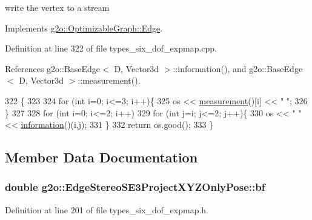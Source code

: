 write the vertex to a stream 



Implements \hyperlink{classg2o_1_1OptimizableGraph_1_1Edge_a804b9a2178249b9297c55b8fbbeda56e}{g2o\+::\+Optimizable\+Graph\+::\+Edge}.



Definition at line 322 of file types\+\_\+six\+\_\+dof\+\_\+expmap.\+cpp.



References g2o\+::\+Base\+Edge$<$ D, Vector3d $>$\+::information(), and g2o\+::\+Base\+Edge$<$ D, Vector3d $>$\+::measurement().


\begin{DoxyCode}
322                                                                 \{
323 
324   \textcolor{keywordflow}{for} (\textcolor{keywordtype}{int} i=0; i<=3; i++)\{
325     os << \hyperlink{classg2o_1_1BaseEdge_a8c20e7ffa66bb7a4a02c8cee82e89c8b}{measurement}()[i] << \textcolor{stringliteral}{" "};
326   \}
327 
328   \textcolor{keywordflow}{for} (\textcolor{keywordtype}{int} i=0; i<=2; i++)
329     \textcolor{keywordflow}{for} (\textcolor{keywordtype}{int} j=i; j<=2; j++)\{
330       os << \textcolor{stringliteral}{" "} <<  \hyperlink{classg2o_1_1BaseEdge_ab682086df7223ce2b039d652416ddc23}{information}()(i,j);
331     \}
332   \textcolor{keywordflow}{return} os.good();
333 \}
\end{DoxyCode}


\subsection{Member Data Documentation}
\subsubsection[{\texorpdfstring{bf}{bf}}]{\setlength{\rightskip}{0pt plus 5cm}double g2o\+::\+Edge\+Stereo\+S\+E3\+Project\+X\+Y\+Z\+Only\+Pose\+::bf}\hypertarget{classg2o_1_1EdgeStereoSE3ProjectXYZOnlyPose_a831d3e73bf61102622a7ac6af0475e7b}{}\label{classg2o_1_1EdgeStereoSE3ProjectXYZOnlyPose_a831d3e73bf61102622a7ac6af0475e7b}


Definition at line 201 of file types\+\_\+six\+\_\+dof\+\_\+expmap.\+h.

